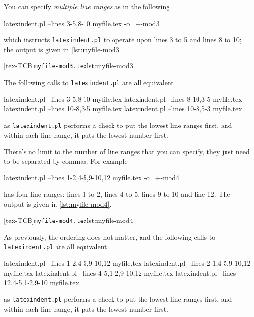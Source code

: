 \documentclass[10pt]{article}
\begin{document}
 \begin{example}
 You can specify \emph{multiple line ranges} as in the following

 \begin{commandshell}
latexindent.pl --lines 3-5,8-10 myfile.tex -o=+-mod3
\end{commandshell}

 which instructs \texttt{latexindent.pl} to operate upon lines 3 to 5 and lines 8 to 10;
 the output is given in \cref{lst:myfile-mod3}.

 [tex-TCB]{\texttt{myfile-mod3.tex}}{lst:myfile-mod3}

 The following calls to \texttt{latexindent.pl} are all equivalent

 \begin{commandshell}
latexindent.pl --lines 3-5,8-10 myfile.tex
latexindent.pl --lines 8-10,3-5 myfile.tex
latexindent.pl --lines 10-8,3-5 myfile.tex
latexindent.pl --lines 10-8,5-3 myfile.tex
\end{commandshell}

 as \texttt{latexindent.pl} performs a check to put the lowest line ranges first, and
 within each line range, it puts the lowest number first.
 \end{example}

 \begin{example}
 There's no limit to the number of line ranges that you can specify, they just need to be
 separated by commas. For example

 \begin{commandshell}
latexindent.pl --lines 1-2,4-5,9-10,12 myfile.tex -o=+-mod4
\end{commandshell}

 has four line ranges: lines 1 to 2, lines 4 to 5, lines 9 to 10 and line 12. The output
 is given in \cref{lst:myfile-mod4}.

 [tex-TCB]{\texttt{myfile-mod4.tex}}{lst:myfile-mod4}

 As previously, the ordering does not matter, and the following calls to
 \texttt{latexindent.pl} are all equivalent

 \begin{commandshell}
latexindent.pl --lines 1-2,4-5,9-10,12 myfile.tex
latexindent.pl --lines 2-1,4-5,9-10,12 myfile.tex
latexindent.pl --lines 4-5,1-2,9-10,12 myfile.tex
latexindent.pl --lines 12,4-5,1-2,9-10 myfile.tex
\end{commandshell}

 as \texttt{latexindent.pl} performs a check to put the lowest line ranges first, and
 within each line range, it puts the lowest number first.
 \end{example}
\end{document}
